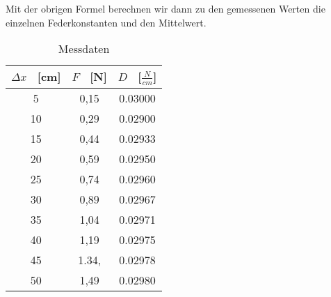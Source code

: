 \documentclass[titlepage = firstcover]{scrartcl}
\begin{document}
        Mit der obrigen Formel berechnen wir dann zu den gemessenen Werten die einzelnen Federkonstanten und den Mittelwert.
        \begin{table}
            \centering
            \caption{Messdaten}
            \label{tab:Tabelle_1}
            
            \begin{tabular}{c c c}
                \toprule
                {$\Delta x$ \ [cm]} & {$F$ \ [N]} & {$D$ \ [$\frac{N}{cm}$]}\\
                \midrule
                5 & 0,15 & 0.03000\\
                10 & 0,29 & 0.02900\\
                15 & 0,44 & 0.02933\\
                20 & 0,59 & 0.02950\\
                25 & 0,74 & 0.02960\\
                30 & 0,89 & 0.02967\\
                35 & 1,04 & 0.02971\\
                40 & 1,19 & 0.02975\\
                45 & 1.34, & 0.02978\\
                50 & 1,49 & 0.02980\\
                \bottomrule
            \end{tabular}    
        \end{table}
        

        
\end{document}
